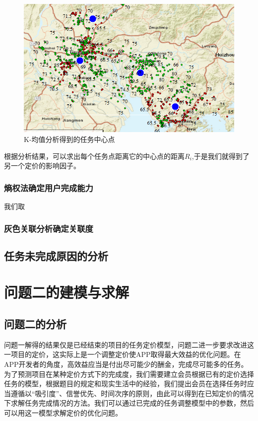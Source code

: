 \documentclass[withoutpreface,bwprint]{cumcmthesis} %
\begin{document}
\begin{figure}[H]
    \centering
    \includegraphics[width=1\textwidth]{2.png} 
    \caption{K-均值分析得到的任务中心点} 
    \label{图} 
\end{figure}
根据分析结果，可以求出每个任务点距离它的中心点的距离$R_i$,于是我们就得到了另一个定价的影响因子。

\subsubsection{熵权法确定用户完成能力}

我们取

\subsubsection{灰色关联分析确定关联度}

\subsection{任务未完成原因的分析}

\section{问题二的建模与求解}

\subsection{问题二的分析}
问题一解得的结果仅是已经结束的项目的任务定价模型，问题二进一步要求改进这一项目的定价，这实际上是一个调整定价使APP取得最大效益的优化问题。在APP开发者的角度，高效益应当是付出尽可能少的酬金，完成尽可能多的任务。为了预测项目在某种定价方式下的完成度，我们需要建立会员根据已有的定价选择任务的模型，根据题目的规定和现实生活中的经验，我们提出会员在选择任务时应当遵循以“吸引度”、信誉优先、时间次序的原则，由此可以得到在已知定价的情况下求解任务完成情况的方法。我们可以通过已完成的任务调整模型中的参数，然后可以用这一模型求解定价的优化问题。

\end{document}
